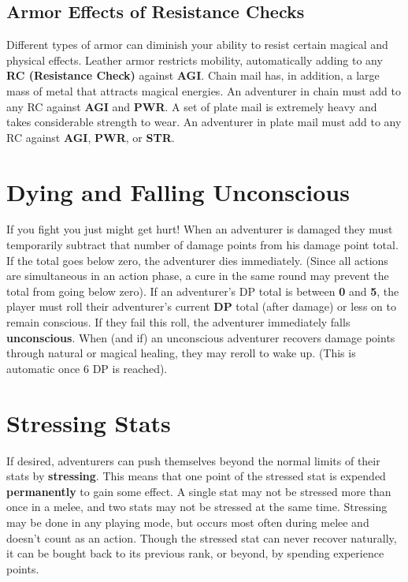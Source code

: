 \begin{multicols*}{2}
\subsection{Armor Effects of Resistance Checks}
Different types of armor can diminish your ability to resist certain magical and physical effects. Leather armor restricts mobility, automatically adding  to any \textbf{RC (Resistance Check)} against \textbf{AGI}. Chain mail has, in addition, a large mass of metal that attracts magical energies. An adventurer in chain must add  to any RC against \textbf{AGI} and \textbf{PWR}. A set of plate mail is extremely heavy and takes considerable strength to wear. An adventurer in plate mail must add  to any RC against \textbf{AGI}, \textbf{PWR}, or \textbf{STR}.
\section{Dying and Falling Unconscious}
If you fight you just might get hurt! When an adventurer is damaged they must temporarily subtract that number of damage points from his damage point total. If the total goes below zero, the adventurer dies immediately. (Since all actions are simultaneous in an action phase, a cure in the same round may prevent the total from going below zero).
If an adventurer's DP total is between \textbf{0} and \textbf{5}, the
player must roll their adventurer's current \textbf{DP} total (after damage) or less on  to remain conscious. If they fail this roll, the adventurer immediately falls \textbf{unconscious}. When (and if) an unconscious adventurer recovers damage points through natural or magical healing, they may reroll to wake up. (This is automatic once 6 DP is reached).
\section{Stressing Stats}
If desired, adventurers can push themselves beyond the normal limits of their stats by \textbf{stressing}. This means that one point of the stressed stat is expended \textbf{permanently} to gain some effect. A single stat may not be stressed more than once in a melee, and two stats may not be stressed at the same time. Stressing may be done in any playing mode, but occurs most often during melee and doesn't count as an action. Though the stressed stat can never recover naturally, it can be bought back to its previous rank, or beyond, by spending experience points.


\end{multicols*}
